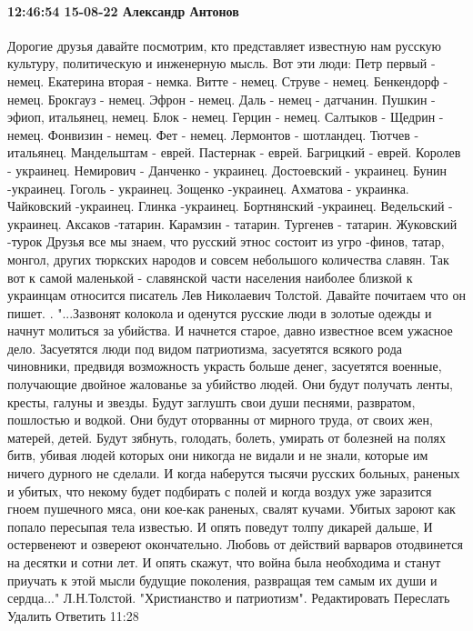  
 
 
 
 

\paragraph{12:46:54 15-08-22 Александр Антонов}

Дорогие друзья давайте посмотрим, кто представляет известную нам русскую культуру, политическую и инженерную мысль.
Вот эти люди:
Петр первый - немец.
Екатерина вторая - немка.
Витте - немец.
Струве - немец.
Бенкендорф - немец.
Брокгауз - немец.
Эфрон - немец.
Даль - немец - датчанин.
Пушкин - эфиоп, итальянец, немец.
Блок - немец.
Герцин - немец.
Салтыков - Щедрин - немец.
Фонвизин - немец.
Фет - немец.
Лермонтов - шотландец.
Тютчев - итальянец.
Мандельштам - еврей.
Пастернак - еврей.
Багрицкий - еврей.
Королев - украинец.
Немирович - Данченко - украинец.
Достоевский - украинец.
Бунин -украинец.
Гоголь - украинец.
Зощенко -украинец.
Ахматова - украинка.
Чайковский -украинец.
Глинка -украинец.
Бортнянский -украинец.
Ведельский - украинец.
Аксаков -татарин.
Карамзин - татарин.
Тургенев - татарин.
Жуковский -турок
Друзья все мы знаем, что русский этнос состоит из угро -финов, татар, монгол, других тюркских народов
и совсем небольшого количества славян.
Так вот к самой маленькой - славянской части населения наиболее близкой к украинцам относится писатель Лев Николаевич Толстой.
Давайте почитаем что он пишет. .
"...Зазвонят колокола и оденутся русские люди в золотые одежды и начнут молиться за убийства. И начнется старое, давно известное всем ужасное дело. Засуетятся люди под видом патриотизма, засуетятся всякого рода чиновники, предвидя возможность украсть больше денег, засуетятся военные, получающие двойное жалованье за убийство людей. Они будут получать ленты, кресты, галуны и звезды. Будут заглушть свои души песнями, развратом, пошлостью и водкой. Они будут оторванны от мирного труда, от своих жен, матерей, детей. Будут зябнуть, голодать, болеть, умирать от болезней на полях битв, убивая людей которых они никогда не видали и не знали, которые им ничего дурного не сделали.
И когда наберутся тысячи русских больных, раненых и убитых, что некому будет подбирать с полей и когда воздух уже заразится гноем пушечного мяса, они кое-как раненых, свалят кучами. Убитых зароют как попало пересыпая тела известью. И опять поведут толпу дикарей дальше, И остервенеют и озвереют окончательно.
Любовь от действий варваров отодвинется на десятки и сотни лет. И опять скажут, что война была необходима и станут приучать к этой мысли будущие поколения, развращая тем самым их души и сердца..."
Л.Н.Толстой.
"Христианство и патриотизм".
Редактировать
Переслать
Удалить
Ответить
11:28
